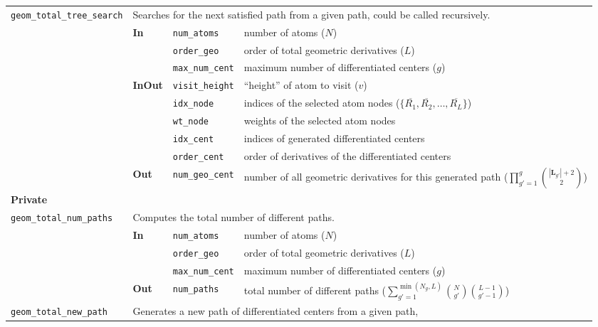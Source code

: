 \documentclass[a4paper,11pt,twoside,openright]{book}
\begin{document}
\begin{center}
\begin{longtable}{l|p{1.1cm}|p{2.3cm}p{7.6cm}}
    \hline
    \verb|geom_total_tree_search|\index{\textsl{public} \texttt{geom\_total\_tree\_search}} & %
      \multicolumn{3}{p{11cm}}{Searches for the next satisfied path from a given path, could be called recursively.}\\
%
    \cline{2-4}
    & \textbf{In} & \verb|num_atoms| & number of atoms ($N$)\\
    \cline{3-4}
    & & \verb|order_geo| & order of total geometric derivatives ($L$)\\
    \cline{3-4}
    & & \verb|max_num_cent| & maximum number of differentiated centers ($g$)\\
    \cline{2-4}
    & \textbf{InOut} & \verb|visit_height| & ``height'' of atom to visit ($v$)\\
    \cline{3-4}
    & & \verb|idx_node| & indices of the selected atom nodes ($\{\overline{R_{1}},\overline{R_{2}},\dots,\overline{R_{L}}\}$)\\
    \cline{3-4}
    & & \verb|wt_node| & weights of the selected atom nodes\\
    \cline{3-4}
    & & \verb|idx_cent| & indices of generated differentiated centers\\
    \cline{3-4}
    & & \verb|order_cent| & order of derivatives of the differentiated centers\\
    \cline{2-4}
    & \textbf{Out} & \verb|num_geo_cent| & number of all geometric derivatives for this generated path %
      ($\prod_{g'=1}^{g}\binom{|\boldsymbol{L}_{g'}|+2}{2}$)\\
    \hline
    \multicolumn{4}{l}{\textbf{Private}}\\
    \hline
    \verb|geom_total_num_paths|\index{\textsl{private} \texttt{geom\_total\_num\_paths}} & %
      \multicolumn{3}{p{11cm}}{Computes the total number of different paths.}\\
    \cline{2-4}
    & \textbf{In} & \verb|num_atoms| & number of atoms ($N$)\\
    \cline{3-4}
    & & \verb|order_geo| & order of total geometric derivatives ($L$)\\
    \cline{3-4}
    & & \verb|max_num_cent| & maximum number of differentiated centers ($g$)\\
    \cline{2-4}
    & \textbf{Out} & \verb|num_paths| & total number of different paths %
      ($\sum_{g'=1}^{\min(N_{g},L)}\binom{N}{g'}\binom{L-1}{g'-1}$)\\
    \hline
    \verb|geom_total_new_path|\index{\textsl{private} \texttt{geom\_total\_new\_path}} & %
      \multicolumn{3}{p{11cm}}{Generates a new path of differentiated centers from a given path, %
}
\end{longtable}
\end{center}
\end{document}
